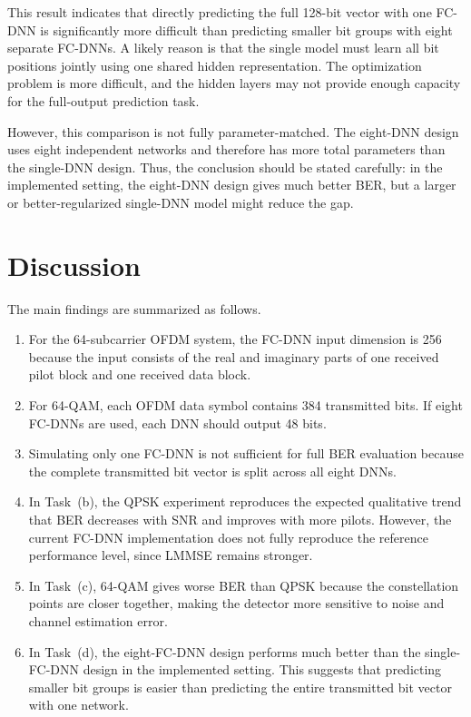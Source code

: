 \documentclass[11pt,a4paper]{article}
\begin{document}
This result indicates that directly predicting the full 128-bit vector with one FC-DNN is significantly more difficult than predicting smaller bit groups with eight separate FC-DNNs. A likely reason is that the single model must learn all bit positions jointly using one shared hidden representation. The optimization problem is more difficult, and the hidden layers may not provide enough capacity for the full-output prediction task.

However, this comparison is not fully parameter-matched. The eight-DNN design uses eight independent networks and therefore has more total parameters than the single-DNN design. Thus, the conclusion should be stated carefully: in the implemented setting, the eight-DNN design gives much better BER, but a larger or better-regularized single-DNN model might reduce the gap.

\section{Discussion}

The main findings are summarized as follows.

\begin{enumerate}
    \item For the 64-subcarrier OFDM system, the FC-DNN input dimension is 256 because the input consists of the real and imaginary parts of one received pilot block and one received data block.

    \item For 64-QAM, each OFDM data symbol contains 384 transmitted bits. If eight FC-DNNs are used, each DNN should output 48 bits.

    \item Simulating only one FC-DNN is not sufficient for full BER evaluation because the complete transmitted bit vector is split across all eight DNNs.

    \item In Task~(b), the QPSK experiment reproduces the expected qualitative trend that BER decreases with SNR and improves with more pilots. However, the current FC-DNN implementation does not fully reproduce the reference performance level, since LMMSE remains stronger.

    \item In Task~(c), 64-QAM gives worse BER than QPSK because the constellation points are closer together, making the detector more sensitive to noise and channel estimation error.

    \item In Task~(d), the eight-FC-DNN design performs much better than the single-FC-DNN design in the implemented setting. This suggests that predicting smaller bit groups is easier than predicting the entire transmitted bit vector with one network.
\end{enumerate}
\end{document}
